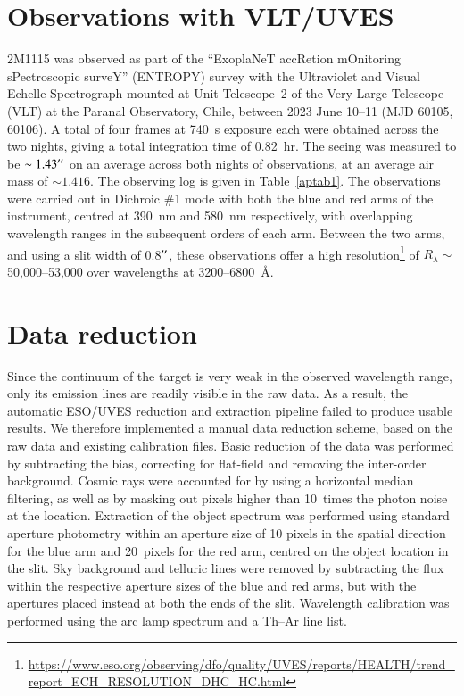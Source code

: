 \documentclass{aa}
\begin{document}
\section{Observations with VLT/UVES} \label{obs}
2M1115 was observed as part of the ``ExoplaNeT accRetion mOnitoring sPectroscopic surveY'' (ENTROPY) survey with the Ultraviolet and Visual Echelle Spectrograph \citep[UVES;][]{uves} mounted at Unit Telescope~2 of the Very Large Telescope (VLT) at the Paranal Observatory, Chile, between 2023 June 10--11 (MJD 60105, 60106). A total of four frames at 740~s exposure each were obtained across the two nights, giving a total integration time of 0.82~hr. The seeing was measured to be $\sim1.43^{\prime\prime}$ on an average across both nights of observations, at an average air mass of $\sim1.416$. The observing log is given in Table~\ref{aptab1}. The observations were carried out in Dichroic \#1 mode with both the blue and red arms of the instrument, centred at 390~nm and 580~nm respectively, with overlapping wavelength ranges in the subsequent orders of each arm. Between the two arms, and using a slit width of 0.8$^{\prime\prime}$, these observations offer a high resolution\footnote{\url{https://www.eso.org/observing/dfo/quality/UVES/reports/HEALTH/trend_report_ECH_RESOLUTION_DHC_HC.html}} of $R_{\lambda}\sim$50,000--53,000 over wavelengths at 3200--6800~\AA. 

\section{Data reduction} \label{reduct}
Since the continuum of the target is very weak in the observed wavelength range, only its emission lines are readily visible in the raw data. As a result, the automatic ESO/UVES reduction and extraction pipeline failed to produce usable results. We therefore implemented a manual data reduction scheme, based on the raw data and existing calibration files. Basic reduction of the data was performed by subtracting the bias, correcting for flat-field and removing the inter-order background. Cosmic rays were accounted for by using a horizontal median filtering, as well as by masking out pixels higher than 10~times the photon noise at the location. Extraction of the object spectrum was performed using standard aperture photometry within an aperture size of 10 pixels in the spatial direction for the blue arm and 20~pixels for the red arm, centred on the object location in the slit. Sky background and telluric lines were removed by subtracting the flux within the respective aperture sizes of the blue and red arms, but with the apertures placed instead at both the ends of the slit. Wavelength calibration was performed using the arc lamp spectrum and a Th--Ar line list.
\end{document}
